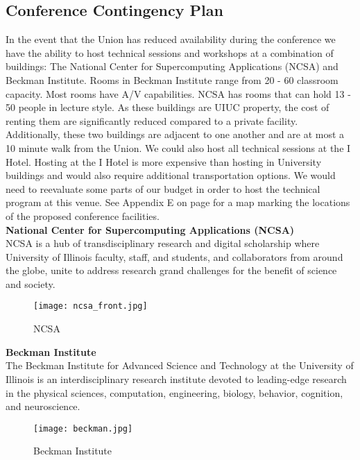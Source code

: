 \subsection{Conference Contingency Plan}
In the event that the Union has reduced availability during the conference we have the ability to host technical sessions and workshops at a combination of buildings: The National Center for Supercomputing Applications (NCSA) and Beckman Institute. Rooms in Beckman Institute range from 20 - 60 classroom capacity. Most rooms have A/V capabilities. NCSA has rooms that can hold 13 - 50 people in lecture style. As these buildings are UIUC property, the cost of renting them are significantly reduced compared to a private facility. Additionally, these two buildings are adjacent to one another and are at most a 10 minute walk from the Union. We could also host all technical sessions at the I Hotel. Hosting at the I Hotel is more expensive than hosting in University buildings and would also require additional transportation options. We would need to reevaluate some parts of our budget in order to host the technical program at this venue. See Appendix E on page \pageref{appendix:map} for a map marking the locations of the proposed conference facilities.\\


\textbf{National Center for Supercomputing Applications (NCSA)}\\
NCSA is a hub of transdisciplinary research and digital scholarship where University of Illinois faculty, staff, and students, and collaborators from around the globe, unite to address research grand challenges for the benefit of science and society.\\
\begin{figure}[H]
	\centering
	\texttt{[image: ncsa\_front.jpg]}
	\caption{NCSA}
	\label{fig:ncsa}
\end{figure}

\textbf{Beckman Institute}\\
The Beckman Institute for Advanced Science and Technology at the University of Illinois is an interdisciplinary research institute devoted to leading-edge research in the physical sciences, computation, engineering, biology, behavior, cognition, and neuroscience.\\

\begin{figure}[H]
	\centering
	\texttt{[image: beckman.jpg]}
	\caption{Beckman Institute}
	\label{fig:beckman}
\end{figure}

